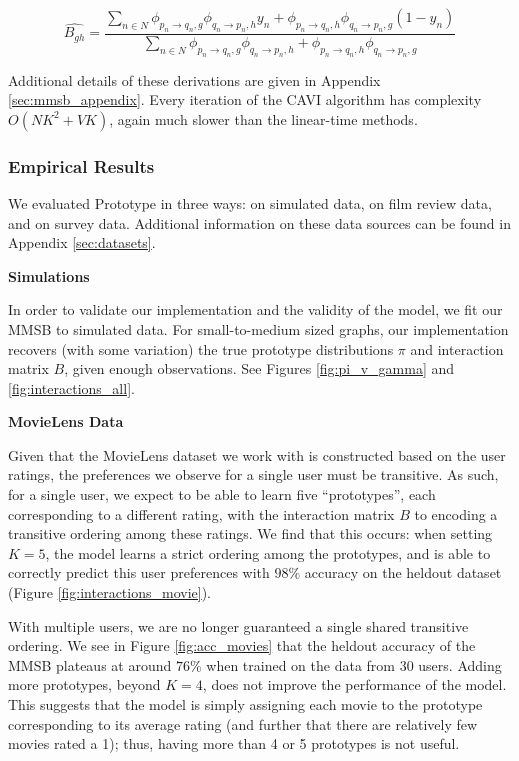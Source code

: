 \[
\hat{B_{gh}} = \frac{
\sum_{n \in N} \phi_{p_n \rightarrow q_n, g} \phi_{q_n \rightarrow p_n, h} y_n + \phi_{p_n \rightarrow q_n, h} \phi_{q_n \rightarrow p_n, g}(1-y_n)
}{
\sum_{n \in N} \phi_{p_n \rightarrow q_n, g} \phi_{q_n \rightarrow p_n, h} + \phi_{p_n \rightarrow q_n, h} \phi_{q_n \rightarrow p_n, g}
}
\]

\bigskip

Additional details of these derivations are given in Appendix \ref{sec:mmsb_appendix}.
Every iteration of the CAVI algorithm has complexity $O(NK^2 + VK)$, again much slower than the linear-time methods.

\subsubsection{Empirical Results}

We evaluated Prototype in three ways: on simulated data, on film review data, and on survey data.
Additional information on these data sources can be found in Appendix \ref{sec:datasets}.

\bigskip

\textbf{Simulations}

\bigskip

In order to validate our implementation and the validity of the model, we fit our MMSB to simulated data.
For small-to-medium sized graphs, our implementation recovers (with some variation) the true prototype distributions $\pi$ and interaction matrix $B$, given enough observations. See Figures \ref{fig:pi_v_gamma} and \ref{fig:interactions_all}.

\bigskip

\textbf{MovieLens Data}

\bigskip

Given that the MovieLens dataset we work with is constructed based on the
user ratings, the preferences we observe for a single user must be transitive.
As such, for a single user, we expect to be able to learn five ``prototypes'', 
each corresponding to a different rating, with the
interaction matrix $B$ to encoding a transitive ordering among these ratings.
We find that this occurs: when setting $K=5$, the model 
learns a strict ordering among the prototypes, and is able to correctly predict 
this user preferences with $98\%$ accuracy on the heldout dataset (Figure \ref{fig:interactions_movie}).  

With multiple users, we are no longer guaranteed a single shared transitive
ordering.
We see in Figure \ref{fig:acc_movies} that the heldout accuracy of the
MMSB plateaus at around $76\%$ when trained on the data from 30 users.
Adding more prototypes, beyond $K=4$, does not improve the
performance of the model. This suggests that the model is simply assigning each
movie to the prototype corresponding to its average rating (and further that there are relatively few movies rated a 1); thus, having more
than 4 or 5 prototypes is not useful.

